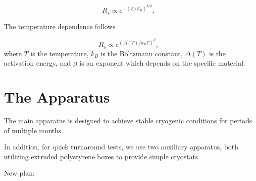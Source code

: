 \documentclass[a4paper,12pt]{article}
\begin{document}
\begin{equation}
\label{eq:efield}
{R_s} \propto e^{- (E / E_0)^{1/2}},
\end{equation}

The temperature dependence follows

\begin{equation}
\label{eq:Tdep}
R_s \propto  e^{( \Delta(T) / k_B T)^{\beta}},
\end{equation}
where $T$ is the temperature, $k_B$ is the Boltzmann constant, $\Delta(T)$ is the activation energy, and $\beta$ is an exponent which depends on the specific material.



\section{The Apparatus}
\label{sec:expsetup}

The main apparatus is designed to achieve stable cryogenic conditions for periods of multiple months. 

In addition, for quick turnaround tests, we use two auxiliary apparatus, both utilizing extruded polystyrene boxes to provide simple cryostats. 


New plan:
\end{document}
